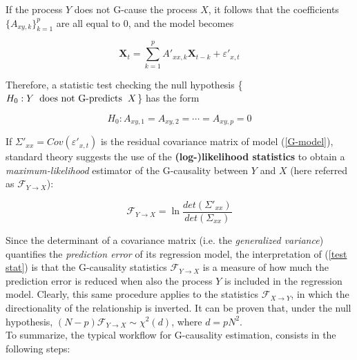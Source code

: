 \documentclass[12pt, a4paper]{report}
\begin{document}
If the process $Y$ does not G-cause the process $X$, it follows that the coefficients $\{A_{xy,k}\}_{k=1}^p $ are all equal to $0$, and the model becomes

\begin{equation}
\textbf{X}_t = \sum_{k=1}^{p} A'_{xx,k} \textbf{X}_{t-k} + \varepsilon'_{x,t} \label{G-model}
\end{equation}

Therefore, a statistic test checking  the null hypothesis \{$ H_0:  Y \hspace{0.2cm} \text{does not G-predicts} \hspace{0.2 cm} X $\} has the form

\begin{equation}
H_0: A_{xy,1} = A_{xy,2} = \cdots = A_{xy,p} = 0
\end{equation}


If  $\Sigma'_{xx} = Cov(\varepsilon'_{x,t}) $ is the residual covariance matrix of model (\ref{G-model}), standard theory \cite{22} %
 suggests the use of the \textbf{(log-)likelihood statistics} to obtain a \textit{maximum-likelihood} estimator of the G-causality between $Y$ and $X$ (here referred as $ \mathcal{F}_{Y \rightarrow X} $):

\begin{equation}
\mathcal{F}_{Y \rightarrow X}  = \ln \frac{det(\Sigma'_{xx})}{det(\Sigma_{xx})} \label{test stat}
\end{equation}


Since the determinant of a covariance matrix (i.e. the \textit{generalized variance}) quantifies the \textit{prediction error} of its regression model, the interpretation of (\ref*{test stat}) is that the G-causality statistics  $ \mathcal{F}_{Y \rightarrow X} $ is a measure of how much the prediction error is reduced when also the process $Y$ is included in the regression model. Clearly, this same procedure applies to the statistics  $ \mathcal{F}_{X \rightarrow Y} $, in which the directionality of the relationship is inverted. It can be proven \cite{23} %
 that, under the null hypothesis, $ (N-p)\mathcal{F}_{Y \rightarrow X} \sim \chi^2(d)$, where $ d = pN^2$.
\\
To summarize, the typical workflow for G-causality estimation, consists in the following steps:
\end{document}
